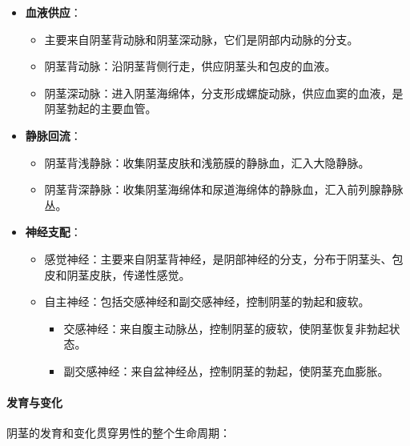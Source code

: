 \begin{itemize}
\item \textbf{血液供应}：
  \begin{itemize}
  \item 主要来自阴茎背动脉和阴茎深动脉，它们是阴部内动脉的分支。
  \item 阴茎背动脉：沿阴茎背侧行走，供应阴茎头和包皮的血液。
  \item 阴茎深动脉：进入阴茎海绵体，分支形成螺旋动脉，供应血窦的血液，是阴茎勃起的主要血管。
  \end{itemize}
\item \textbf{静脉回流}：
  \begin{itemize}
  \item 阴茎背浅静脉：收集阴茎皮肤和浅筋膜的静脉血，汇入大隐静脉。
  \item 阴茎背深静脉：收集阴茎海绵体和尿道海绵体的静脉血，汇入前列腺静脉丛。
  \end{itemize}
\item \textbf{神经支配}：
  \begin{itemize}
  \item 感觉神经：主要来自阴茎背神经，是阴部神经的分支，分布于阴茎头、包皮和阴茎皮肤，传递性感觉。
  \item 自主神经：包括交感神经和副交感神经，控制阴茎的勃起和疲软。
    \begin{itemize}
    \item 交感神经：来自腹主动脉丛，控制阴茎的疲软，使阴茎恢复非勃起状态。
    \item 副交感神经：来自盆神经丛，控制阴茎的勃起，使阴茎充血膨胀。
    \end{itemize}
  \end{itemize}
\end{itemize}

\paragraph{发育与变化}

阴茎的发育和变化贯穿男性的整个生命周期：

